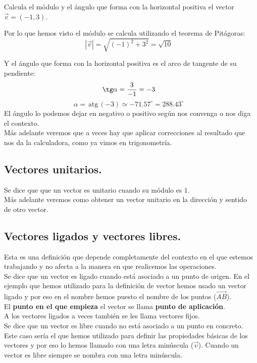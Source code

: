 \documentclass[a4paper,11pt,answers]{exam}
\newcommand{\atg}{\,\mathrm{atg}\,}
\newcommand{\degree}{^\circ}
\begin{document}
\begin{questions}
\question Calcula el módulo y el ángulo que forma con la horizontal positiva el vector $\vec{v} = (-1,3)$.
  \begin{solution}
    Por lo que hemos visto el módulo se calcula utilizando el teorema de Pitágoras:
    \[|\vec{v}| = \sqrt{(-1)^2 + 3^2} = \sqrt{10}\]

    Y el ángulo que forma con la horizontal positiva es el arco de tangente de su pendiente:
    \[\tg \alpha = \frac{3}{-1} = -3\]
    \[\alpha = \atg (-3) \simeq -71.57\degree = 288.43\degree\]
    El ángulo lo podemos dejar en negativo o positivo según nos convenga o nos diga el contexto.\\
    Más adelante veremos que a veces hay que aplicar correcciones al resultado que nos
    da la calculadora, como ya vimos en trigonometría.
  \end{solution}
\end{questions}
\subsection{Vectores unitarios.}\label{vector_unitario}
Se dice que que un vector es unitario cuando su módulo es $1$.\\
Más adelante veremos como obtener un vector unitario en la dirección y sentido de otro vector.

\subsection{Vectores ligados y vectores libres.}
Esta es una definición que depende completamente del contexto en el que estemos trabajando y no
afecta a la manera en que realicemos las operaciones.\\

Se dice que un vector es ligado cuando está asociado a un punto de origen. En el ejemplo que hemos
utilizado para la definición de vector hemos usado un vector ligado y por eso en el nombre
hemos puesto el nombre de los puntos ($\overrightarrow{AB}$).\\
El \textbf{punto en el que empieza} el vector se llama \textbf{punto de aplicación}.\\
A los vectores ligados a veces también se les llama vectores fijos.\\

Se dice que un vector es libre cuando no está asociado a un punto en concreto. Este caso sería el
que hemos utilizado para definir las propiedades básicas de los vectores y por eso lo hemos
llamado con una letra minúscula ($\vec{v}$). Cuando un vector es libre siempre se nombra con
una letra minúscula.
\end{document}
